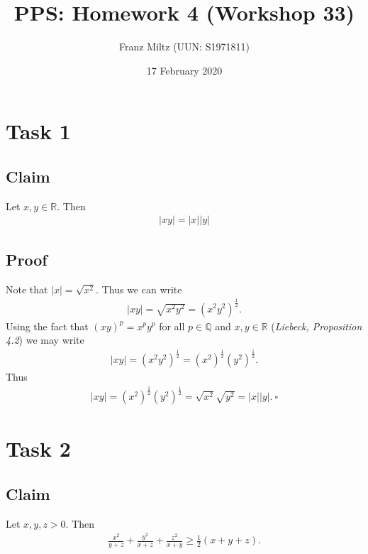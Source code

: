\documentclass{article}
\title{PPS: Homework 4 (Workshop 33)}
\author{Franz Miltz (UUN: S1971811)}
\date{17 February 2020}
\begin{document}
\maketitle
\section*{Task 1}
\subsection*{Claim}
Let $x,y\in\mathbb{R}$. Then
\begin{align*}
  |xy|=|x||y|
\end{align*}
\subsection*{Proof}
Note that $|x|=\sqrt{x^2}$. Thus we can write
\begin{align*}
  |xy|=\sqrt{x^2y^2}=(x^2y^2)^\frac{1}{2}.
\end{align*}
Using the fact that $(xy)^p=x^py^p$ for all $p\in\mathbb{Q}$ and $x,y\in\mathbb{R}$ (\emph{Liebeck, Proposition 4.2}) we may write
\begin{align*}
  |xy|=(x^2y^2)^\frac{1}{2}=(x^2)^\frac{1}{2}(y^2)^\frac{1}{2}.
\end{align*}
Thus
\begin{align*}
  |xy|=(x^2)^\frac{1}{2}(y^2)^\frac{1}{2}=\sqrt{x^2}\sqrt{y^2}=|x||y|.\:\square
\end{align*}
\section*{Task 2}
\subsection*{Claim}
Let $x,y,z>0$. Then
\begin{align*}
  \frac{x^2}{y+z}+\frac{y^2}{x+z}+\frac{z^2}{x+y}\geq\frac{1}{2}(x+y+z).
\end{align*}
\end{document}
